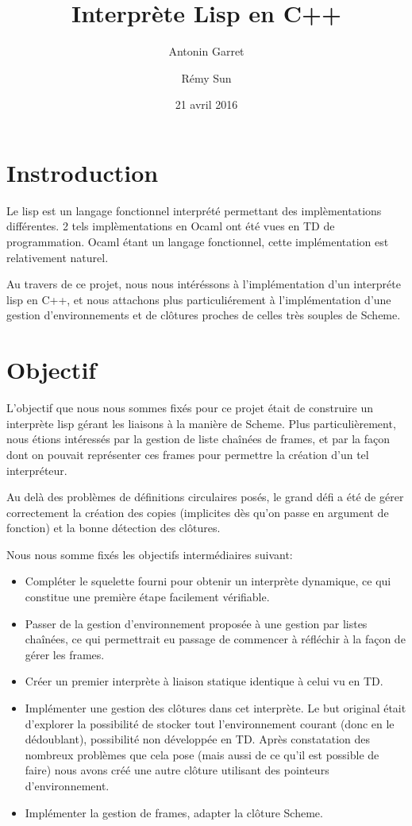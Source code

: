 \documentclass[a4paper,11pt]{article}
\title{Interprète Lisp en C++}
\author{Antonin Garret \and Rémy Sun}
\date{21 avril 2016}
\begin{document}
\maketitle

\section{Instroduction}

Le lisp est un langage fonctionnel interprété permettant des implèmentations
différentes. 2 tels implèmentations en Ocaml ont été vues en TD de
programmation. Ocaml étant un langage fonctionnel, cette implémentation est
relativement naturel.

Au travers de ce projet, nous nous intéréssons à l'implémentation d'un
interpréte lisp en C++, et nous attachons plus particuliérement à
l'implémentation d'une gestion d'environnements et de clôtures proches de celles
très souples de Scheme.

\section{Objectif}

L'objectif que nous nous sommes fixés pour ce projet était de construire un
interprète lisp gérant les liaisons à la manière de Scheme. Plus
particulièrement, nous étions intéressés par la gestion de liste chaînées de
frames, et par la façon dont on pouvait représenter ces frames pour permettre la
création d'un tel interpréteur.

Au delà des problèmes de définitions circulaires posés, le grand défi a été de
gérer correctement la création des copies (implicites dès qu'on passe en
argument de fonction) et la bonne détection des clôtures.

Nous nous somme fixés les objectifs intermédiaires suivant:
\begin{itemize}
\item Compléter le squelette fourni pour obtenir un interprète dynamique, ce qui
  constitue une première étape facilement vérifiable.
\item Passer de la gestion d'environnement proposée à une gestion par listes
  chaînées, ce qui permettrait eu passage de commencer à réfléchir à la façon de
  gérer les frames.
\item Créer un premier interprète à liaison statique identique à celui vu en TD.
\item Implémenter une gestion des clôtures dans cet interprète. Le but original
  était d'explorer la possibilité de stocker tout l'environnement courant (donc
  en le dédoublant), possibilité non développée en TD. Après constatation des
  nombreux problèmes que cela pose (mais aussi de ce qu'il est possible de
  faire) nous avons créé une autre clôture utilisant des pointeurs
  d'environnement.
\item Implémenter la gestion de frames, adapter la clôture Scheme.
\end{itemize}
\end{document}
